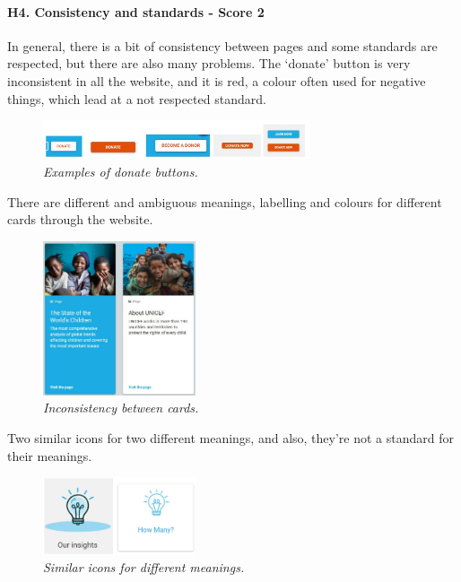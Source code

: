 \paragraph{H4. Consistency and standards - Score 2} \label{subsec:H4}	In general, there is a bit of consistency between pages and some standards are respected, but there are also many problems.
\newline The ‘donate’ button is very inconsistent in all the website, and it is red, a colour often used for negative things, which lead at a not respected standard.
\begin{figure}[!h]
	\begin{center}
		\includegraphics[width=0.7\textwidth]{FinalScores8.jpg}
		\captionsetup{font=small}
		\caption{\textit{Examples of donate buttons.}}
	\end{center}
\end{figure}
\newline There are different and ambiguous meanings, labelling and colours for different cards through the website.
\begin{figure}[!h]
	\begin{center}
		\includegraphics[width=0.4\textwidth]{FinalScores9.jpg}
		\captionsetup{font=small}
		\caption{\textit{Inconsistency between cards.}}
	\end{center}
\end{figure}
\newline Two similar icons for two different meanings, and also, they’re not a standard for their meanings.
\begin{figure}[!h]
	\begin{center}
		\includegraphics[width=0.4\textwidth]{FinalScores10.jpg}
		\captionsetup{font=small}
		\caption{\textit{Similar icons for different meanings.}}
	\end{center}
\end{figure}
